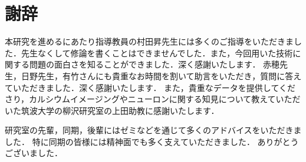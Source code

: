 \chapter*{謝辞}
本研究を進めるにあたり指導教員の村田昇先生には多くのご指導をいただきました．先生なくして修論を書くことはできませんでした．また，今回用いた技術に関する問題の面白さを知ることができました．深く感謝いたします．
赤穂先生，日野先生，有竹さんにも貴重なお時間を割いて助言をいただき，質問に答えていただきました．深く感謝いたします．
また，貴重なデータを提供してくださり，カルシウムイメージングやニューロンに関する知見について教えていただいた筑波大学の柳沢研究室の上田助教に感謝いたします．

研究室の先輩，同期，後輩にはゼミなどを通じて多くのアドバイスをいただきました．
特に同期の皆様には精神面でも多く支えていただきました．
ありがとうございました．
